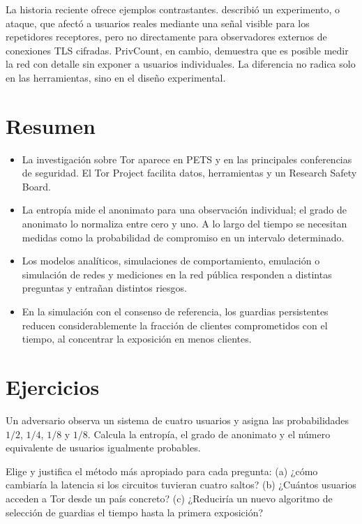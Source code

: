 La historia reciente ofrece ejemplos contrastantes.  describió un experimento, o ataque, que afectó a usuarios reales mediante una señal visible para los repetidores receptores, pero no directamente para observadores externos de conexiones TLS cifradas. PrivCount, en cambio, demuestra que es posible medir la red con detalle sin exponer a usuarios individuales. La diferencia no radica solo en las herramientas, sino en el diseño experimental.

\section*{Resumen}
\begin{itemize}
  \item La investigación sobre Tor aparece en PETS y en las principales conferencias de seguridad. El Tor Project facilita datos, herramientas y un Research Safety Board.
  \item La entropía mide el anonimato para una observación individual; el grado de anonimato lo normaliza entre cero y uno. A lo largo del tiempo se necesitan medidas como la probabilidad de compromiso en un intervalo determinado.
  \item Los modelos analíticos, simulaciones de comportamiento, emulación o simulación de redes y mediciones en la red pública responden a distintas preguntas y entrañan distintos riesgos.
  \item En la simulación con el consenso de referencia, los guardias persistentes reducen considerablemente la fracción de clientes comprometidos con el tiempo, al concentrar la exposición en menos clientes.
\end{itemize}

\section*{Ejercicios}

\begin{esercizio}[1]\label{es:29-entropia}
Un adversario observa un sistema de cuatro usuarios y asigna las probabilidades $1/2$, $1/4$, $1/8$ y $1/8$. Calcula la entropía, el grado de anonimato y el número equivalente de usuarios igualmente probables.
\end{esercizio}

\begin{esercizio}[1]\label{es:29-metodo}
Elige y justifica el método más apropiado para cada pregunta: (a) ¿cómo cambiaría la latencia si los circuitos tuvieran cuatro saltos? (b) ¿Cuántos usuarios acceden a Tor desde un país concreto? (c) ¿Reduciría un nuevo algoritmo de selección de guardias el tiempo hasta la primera exposición?
\end{esercizio}

